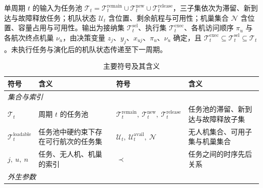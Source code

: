 单周期 $t$ 的输入为任务池 $\mathcal{T}_t=\mathcal{T}_t^{\mathrm{remain}}\cup\mathcal{T}_t^{\mathrm{new}}\cup\mathcal{T}_t^{\mathrm{release}}$，三子集依次为滞留、新到达与故障释放任务；机队状态 $\mathcal{U}_t$ 含位置、剩余航程与可用性；机巢集合 $\mathcal{N}$ 含位置、容量占用与可用性。输出为接纳集 $\mathcal{T}_t^{\mathrm{sel}}$、执行集 $\mathcal{T}_t^{\mathrm{exec}}$、各机访问顺序 $\pi_u$ 与各航次终点机巢 $\nu_u$，由决策变量 $z_j$、$y_j$、$x_{uj}$、$\pi_u$、$\nu_u$ 确定，且 $\mathcal{T}_t^{\mathrm{exec}}\subseteq\mathcal{T}_t^{\mathrm{sel}}\subseteq\mathcal{T}_t$。未执行任务与演化后的机队状态传递至下一周期。

\begin{table}[htbp]
      \centering
      \caption{主要符号及其含义}\label{tab:symbols}
      \begin{tabularx}{\textwidth}{lXlX}
            \toprule
            符号                                                             & 含义                                   & 符号                                                                                                  & 含义                              \\
            \midrule
            \multicolumn{4}{l}{\emph{集合与索引}}                                                                                                                                                                                                              \\
            $\mathcal{T}_t$                                                & 周期 $t$ 的任务池                          & $\mathcal{T}_t^{\mathrm{remain}},\ \mathcal{T}_t^{\mathrm{new}},\ \mathcal{T}_t^{\mathrm{release}}$ & 任务池的滞留、新到达与故障释放子集               \\
            $\mathcal{T}_t^{\mathrm{loadable}}$                            & 任务池中硬约束下存在可行航次的任务集                   & $\mathcal{U}_t,\ \mathcal{U}_t^{\mathrm{avail}},\ \mathcal{N}$                                      & 无人机集合、可用子集与机巢集合                 \\
            $j,\ u,\ n$                                                    & 任务、无人机、机巢的索引                         & $\prec$                                                                                             & 任务之间的时序先后关系                     \\
            \midrule
            \multicolumn{4}{l}{\emph{外生参数}}                                                                                                                                                                                                               \\

\end{tabularx}
\end{table}

